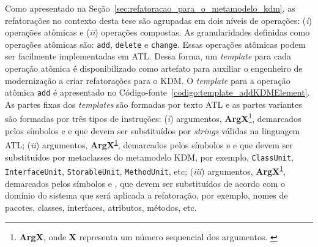 

Como apresentado na Seção~\ref{sec:refatoracao_para_o_metamodelo_kdm}, as refatorações no contexto desta tese são agrupadas em dois níveis de operações: (\textit{i}) operações atômicas e (\textit{ii}) operações compostas. As granularidades definidas como operações atômicas são: \texttt{add}, \texttt{delete} e \texttt{change}. Essas operações atômicas podem ser facilmente implementadas em ATL. Dessa forma, um \textit{template} para cada operação atômica é disponibilizado como artefato para auxiliar o engenheiro de modernização a criar refatorações para o KDM. O \textit{template} para a operação atômica \texttt{add} é apresentado no Código-fonte~\ref{codigo:template_addKDMElement}. As partes fixas dos \textit{templates} são formadas por texto ATL e as partes variantes são formadas por três tipos de instruções: (\textit{i}) argumentos, \textbf{ArgX}\footnote{\textbf{ArgX}, onde \textbf{X} representa um número sequencial dos argumentos. \label{foot:Arg}}, demarcados pelos símbolos \aspas{\textbf{<\#}} e \aspas{\textbf{\#>}} e que devem ser substituídos por \textit{strings} válidas na linguagem ATL; (\textit{ii}) argumentos, \textbf{ArgX}\textsuperscript{\ref{foot:Arg}}, demarcados pelos símbolos \aspas{\textbf{<\%}} e \aspas{\textbf{\%>}} e que devem ser substituídos por metaclasses do metamodelo KDM, por exemplo, \texttt{ClassUnit}, \texttt{InterfaceUnit}, \texttt{StorableUnit}, \texttt{MethodUnit}, etc; (\textit{iii}) argumentos, \textbf{ArgX}\textsuperscript{\ref{foot:Arg}}, demarcados pelos símbolos  e , que devem ser substituídos de acordo com o domínio do sistema que será aplicada a refatoração, por exemplo, nomes de pacotes, classes, interfaces, atributos, métodos, etc.  

